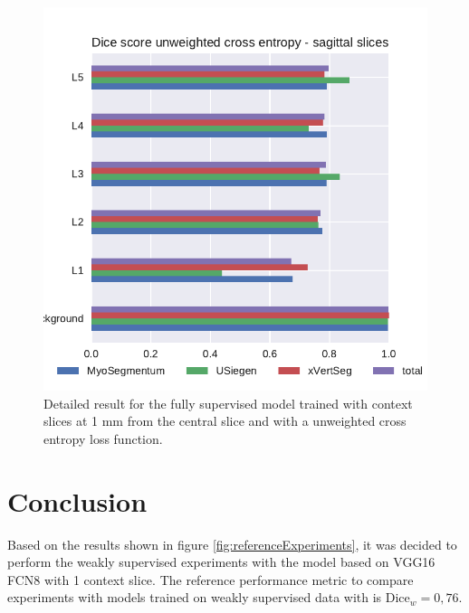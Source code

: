 \begin{figure}
    \centering
    \includegraphics[width=.95\textwidth]{images/full_perClass_perSource_notweighted.pdf}
    \caption{Detailed result for the fully supervised model trained with context slices at 1 mm from the central slice and with a unweighted cross entropy loss function.
    \label{fig:referencenonWeighted}}
\end{figure}



\section{Conclusion}
\par{
    Based on the results shown in figure \ref{fig:referenceExperiments}, it was decided to perform the weakly supervised experiments with the model based on VGG16 FCN8 with 1 context slice.
    The reference performance metric to compare experiments with models trained on weakly supervised data with is $\text{Dice}_w=0,76$.
}


